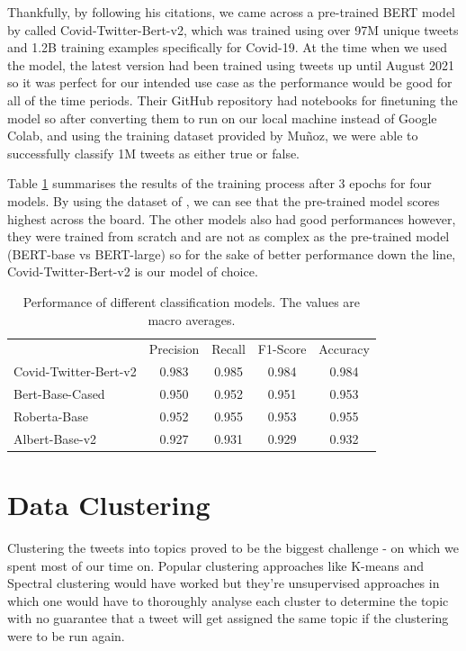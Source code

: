\documentclass{l4proj}
\begin{document}
Thankfully, by following his citations, we came across a pre-trained BERT model by  \cite{muller2020covid} called Covid-Twitter-Bert-v2, which was trained using over 97M unique tweets and 1.2B training examples specifically for Covid-19. At the time when we used the model, the latest version had been trained using tweets up until August 2021 so it was perfect for our intended use case as the performance would be good for all of the time periods. Their GitHub repository had notebooks for finetuning the model so after converting them to run on our local machine instead of Google Colab, and using the training dataset provided by Muñoz, we were able to successfully classify 1M tweets as either true or false.

Table \ref{tab:train} summarises the results of the training process after 3 epochs for four models. By using the dataset of \cite{fnpcovid}, we can see that the pre-trained model scores highest across the board. The other models also had good performances however, they were trained from scratch and are not as complex as the pre-trained model (BERT-base vs BERT-large) so for the sake of better performance down the line, Covid-Twitter-Bert-v2 is our model of choice.

\begin{table}[h]
\centering
\begin{tabular}[width=1.0\linewidth]{lcccc}
                      & \multicolumn{1}{l}{Precision} & \multicolumn{1}{l}{Recall} & \multicolumn{1}{l}{F1-Score} & \multicolumn{1}{l}{Accuracy} \\
Covid-Twitter-Bert-v2 & 0.983                         & 0.985                      & 0.984                        & 0.984                        \\
Bert-Base-Cased       & 0.950                         & 0.952                      & 0.951                        & 0.953                        \\
Roberta-Base          & 0.952                         & 0.955                      & 0.953                        & 0.955                        \\
Albert-Base-v2        & 0.927                         & 0.931                      & 0.929                        & 0.932                       
\end{tabular}
\caption{Performance of different classification models. The values are macro averages.}
\label{tab:train}
\end{table}

\section{Data Clustering}
Clustering the tweets into topics proved to be the biggest challenge - on which we spent most of our time on. Popular clustering approaches like K-means and Spectral clustering would have worked but they're unsupervised approaches in which one would have to thoroughly analyse each cluster to determine the topic with no guarantee that a tweet will get assigned the same topic if the clustering were to be run again.
\end{document}
